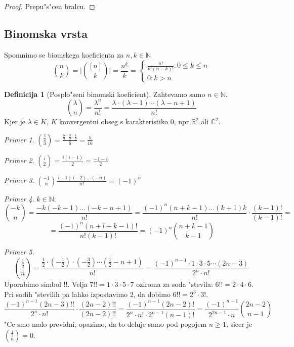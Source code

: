 \documentclass[a4paper,12pt]{article}
\theoremstyle{definition}
\newtheorem{defn}[counter]{Definicija}
\theoremstyle{remark}
\newtheorem*{ex}{Primer}
\newcommand{\N}{\mathbb{N}}
\newcommand{\R}{\mathbb{R}}
\newcommand{\C}{\mathbb{C}}
\begin{document}
\begin{proof}
    Prepu"s"cen bralcu.
\end{proof}


\subsection{Binomska vrsta}
Spomnimo se biomskega koeficienta za $n, k \in \N$
\[\binom{n}{k} = \bigg|\binom{[n]}{k}\bigg| = \frac{n^{\underline{k}}}{k} = \begin{cases}\frac{n!}{k!(n-k)!}: 0 \leqslant k \leqslant n \\ 0: k > n\end{cases}\] %
\begin{defn}[Posplo"seni binomski koeficient]
	Zahtevamo samo $n \in \N$.
	\[\binom{\lambda}{n} = \frac{\lambda^{\underline{n}}}{n!} = \frac{\lambda \cdot (\lambda - 1) \cdots (\lambda - n + 1)}{n!}\]
	Kjer je $\lambda \in K$, $K$ konvergentni obseg s karakteristiko $0$, npr $\R^2$ ali $\C^2$.
\end{defn}
\begin{ex}
	$\binom{\frac{5}{2}}{3} = \frac{\frac{5}{2} \cdot \frac{3}{2} \cdot \frac{1}{2}}{6} = \frac{5}{16}$
\end{ex}
\begin{ex}
	$\binom{i}{2} = \frac{i (i - 1)}{2} = \frac{-1 -i}{2}$
\end{ex}
\begin{ex}
	$\binom{-1}{n} \frac{(-1)(-2)...(-n)}{n!} = (-1)^n$
\end{ex}
\begin{ex}
	$k \in \N$:
	\[\binom{-k}{n} = \frac{-k (-k - 1) ... (-k - n + 1)}{n!} = \frac{(-1)^n (n + k - 1) ... (k + 1) k}{n!} \cdot \frac{(k - 1)!}{(k - 1)!} = \]
	\[ = \frac{(-1)^n (n+l+k-1)!}{n! (k - 1)!} = (-1)^n \binom{n + k - 1}{k - 1}\]
\end{ex}
\begin{ex}
	\[\binom{\frac{1}{2}}{n} = \frac{\frac{1}{2}\cdot(-\frac{1}{2})\cdot(-\frac{3}{2})\cdots(\frac{1}{2}-n+1)}{n!}=\frac{(-1)^{n-1}\cdot1\cdot3\cdot5\cdots(2n-3)}{2^n\cdot n!}\]
	Uporabimo simbol $!!$. Velja $7!! = 1\cdot3\cdot5\cdot7$ oziroma za soda "stevila: $6!! = 2\cdot4\cdot6$. Pri sodih "stevilih pa lahko izpostavimo $2$, da dobimo $6!! = 2^3 \cdot 3!$.
	\[\frac{(-1)^{n-1}(2n-3)!!}{2^n\cdot n!}\cdot\frac{(2n-2)!!}{(2n-2)!!} =
	\frac{(-1)^{n-1}(2n-2)!}{2^n \cdot n!\cdot 2^{n-1}(n-1)!} = \frac{(-1)^{n-1}}{2^{2n-1}\cdot n}\binom{2n-2}{n-1}\]
	"Ce smo malo previdni, opazimo, da to deluje samo pod pogojem $n \geqslant 1$, sicer je $\binom{\frac{1}{2}}{n} = 0$.
\end{ex}
\end{document}
